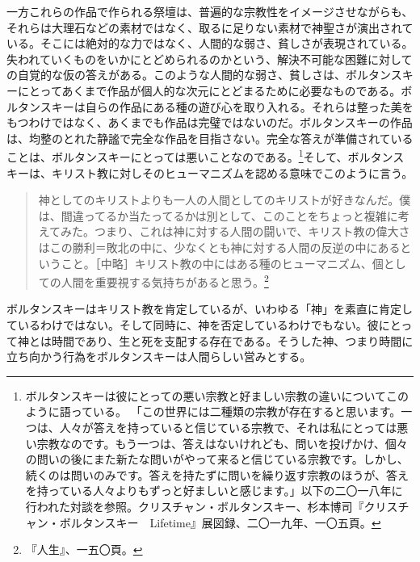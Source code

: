 \documentclass[b5j,twoside,twocolumn]{utarticle}
\begin{document}
一方これらの作品で作られる祭壇は、普遍的な宗教性をイメージさせながらも、それらは大理石などの素材ではなく、取るに足りない素材で神聖さが演出されている。そこには絶対的な力ではなく、人間的な弱さ、貧しさが表現されている。失われていくものをいかにとどめられるのかという、解決不可能な困難に対しての自覚的な仮の答えがある。このような人間的な弱さ、貧しさは、ボルタンスキーにとってあくまで作品が個人的な次元にとどまるために必要なものである。ボルタンスキーは自らの作品にある種の遊び心を取り入れる。それらは整った美をもつわけではなく、あくまでも作品は完璧ではないのだ。ボルタンスキーの作品は、均整のとれた静謐で完全な作品を目指さない。完全な答えが準備されていることは、ボルタンスキーにとっては悪いことなのである。\footnote{ボルタンスキーは彼にとっての悪い宗教と好ましい宗教の違いについてこのように語っている。
「この世界には二種類の宗教が存在すると思います。一つは、人々が答えを持っていると信じている宗教で、それは私にとっては悪い宗教なのです。もう一つは、答えはないけれども、問いを投げかけ、個々の問いの後にまた新たな問いがやって来ると信じている宗教です。しかし、続くのは問いのみです。答えを持たずに問いを繰り返す宗教のほうが、答えを持っている人々よりもずっと好ましいと感じます。」以下の二〇一八年に行われた対談を参照。クリスチャン・ボルタンスキー、杉本博司『クリスチャン・ボルタンスキー　Lifetime』展図録、二〇一九年、一〇五頁。}そして、ボルタンスキーは、キリスト教に対しそのヒューマニズムを認める意味でこのように言う。
\begin{quote}
神としてのキリストよりも一人の人間としてのキリストが好きなんだ。僕は、間違ってるか当たってるかは別として、このことをちょっと複雑に考えてみた。つまり、これは神に対する人間の闘いで、キリスト教の偉大さはこの勝利＝敗北の中に、少なくとも神に対する人間の反逆の中にあるということ。［中略］キリスト教の中にはある種のヒューマニズム、個としての人間を重要視する気持ちがあると思う。\footnote{『人生』、一五〇頁。}
\end{quote}


ボルタンスキーはキリスト教を肯定しているが、いわゆる「神」を素直に肯定しているわけではない。そして同時に、神を否定しているわけでもない。彼にとって神とは時間であり、生と死を支配する存在である。そうした神、つまり時間に立ち向かう行為をボルタンスキーは人間らしい営みとする。
\end{document}
